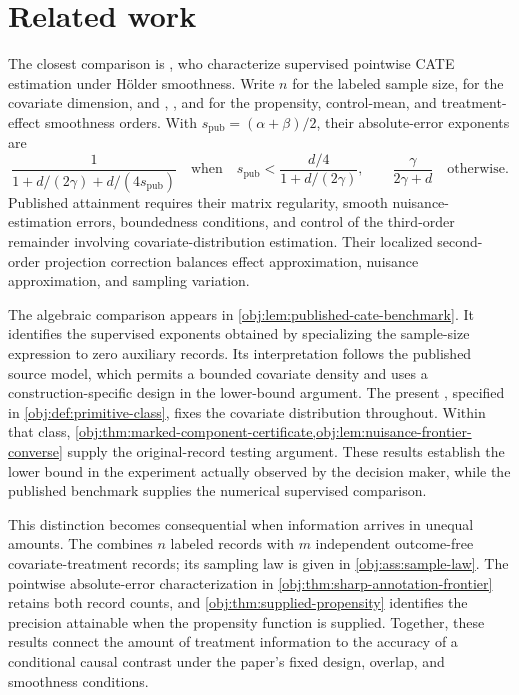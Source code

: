 \section{Related work}\label{sec:related-work}

The closest comparison is \citet[Section 3, Theorems 1--2 and equation (14)]{KennedyBalakrishnanRobinsWasserman2024}, who characterize supervised pointwise CATE estimation under H\"older smoothness. Write \(n\) for the labeled sample size,  for the covariate dimension, and , , and  for the propensity, control-mean, and treatment-effect smoothness orders. With \(s_{\mathrm{pub}}=(\alpha+\beta)/2\), their absolute-error exponents are
\[
\frac{1}{1+d/(2\gamma)+d/(4s_{\mathrm{pub}})}
\quad\text{when}\quad
s_{\mathrm{pub}}<\frac{d/4}{1+d/(2\gamma)},
\qquad
\frac{\gamma}{2\gamma+d}
\quad\text{otherwise}.
\]
Published attainment requires their matrix regularity, smooth nuisance-estimation errors, boundedness conditions, and control of the third-order remainder involving covariate-distribution estimation. Their localized second-order projection correction balances effect approximation, nuisance approximation, and sampling variation.

The algebraic comparison appears in \cref{obj:lem:published-cate-benchmark}. It identifies the supervised exponents obtained by specializing the sample-size expression to zero auxiliary records. Its interpretation follows the published source model, which permits a bounded covariate density and uses a construction-specific design in the lower-bound argument. The present , specified in \cref{obj:def:primitive-class}, fixes the covariate distribution throughout. Within that class, \cref{obj:thm:marked-component-certificate,obj:lem:nuisance-frontier-converse} supply the original-record testing argument. These results establish the lower bound in the experiment actually observed by the decision maker, while the published benchmark supplies the numerical supervised comparison.

This distinction becomes consequential when information arrives in unequal amounts. The  combines \(n\) labeled records with \(m\) independent outcome-free covariate-treatment records; its sampling law is given in \cref{obj:ass:sample-law}. The pointwise absolute-error characterization in \cref{obj:thm:sharp-annotation-frontier} retains both record counts, and \cref{obj:thm:supplied-propensity} identifies the precision attainable when the propensity function is supplied. Together, these results connect the amount of treatment information to the accuracy of a conditional causal contrast under the paper's fixed design, overlap, and smoothness conditions.

